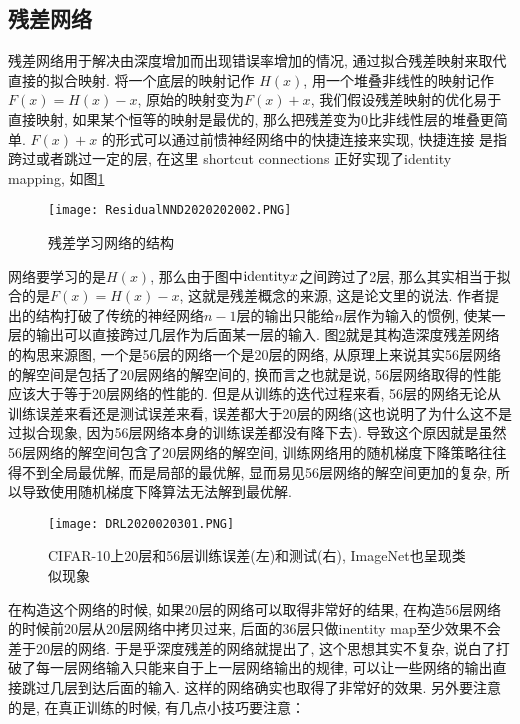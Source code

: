 \subsection{残差网络}
残差网络用于解决由深度增加而出现错误率增加的情况, 通过拟合残差映射来取代直接的拟合映射.
将一个底层的映射记作 $H(x)$, 用一个堆叠非线性的映射记作 $F(x) = H(x) - x$, 原始的映射变为$F(x) + x$, 我们假设残差映射的优化易于直接映射, 如果某个恒等的映射是最优的, 那么把残差变为0比非线性层的堆叠更简单.
$F(x) + x$ 的形式可以通过前愦神经网络中的快捷连接来实现, 快捷连接 是指跨过或者跳过一定的层, 在这里 shortcut connections 正好实现了identity mapping, 如图\ref{ResidualNND2020202002}
\begin{figure}[H]
    \centering
    \texttt{[image: ResidualNND2020202002.PNG]}
    \caption{残差学习网络的结构}
    \label{ResidualNND2020202002}
    \vspace{-0.4cm}
\end{figure}
网络要学习的是$H(x)$, 那么由于图中$\textup{identity} x$之间跨过了2层, 那么其实相当于拟合的是$F(x)=H(x)-x$, 这就是残差概念的来源, 这是论文里的说法.
作者提出的结构打破了传统的神经网络$n-1$层的输出只能给$n$层作为输入的惯例, 使某一层的输出可以直接跨过几层作为后面某一层的输入.
图\ref{DRL2020020301}就是其构造深度残差网络的构思来源图, 一个是56层的网络一个是20层的网络, 从原理上来说其实56层网络的解空间是包括了20层网络的解空间的, 换而言之也就是说, 56层网络取得的性能应该大于等于20层网络的性能的.
但是从训练的迭代过程来看, 56层的网络无论从训练误差来看还是测试误差来看, 误差都大于20层的网络(这也说明了为什么这不是过拟合现象, 因为56层网络本身的训练误差都没有降下去).
导致这个原因就是虽然56层网络的解空间包含了20层网络的解空间, 训练网络用的随机梯度下降策略往往得不到全局最优解, 而是局部的最优解, 显而易见56层网络的解空间更加的复杂, 所以导致使用随机梯度下降算法无法解到最优解.
\begin{figure}[H]
    \centering
    \texttt{[image: DRL2020020301.PNG]}
    \caption{CIFAR-10上20层和56层训练误差(左)和测试(右), ImageNet也呈现类似现象}
    \label{DRL2020020301}
    \vspace{-0.4cm}
\end{figure}

在构造这个网络的时候, 如果20层的网络可以取得非常好的结果, 在构造56层网络的时候前20层从20层网络中拷贝过来, 后面的36层只做inentity map至少效果不会差于20层的网络.
于是乎深度残差的网络就提出了, 这个思想其实不复杂, 说白了打破了每一层网络输入只能来自于上一层网络输出的规律, 可以让一些网络的输出直接跳过几层到达后面的输入.
这样的网络确实也取得了非常好的效果. 另外要注意的是, 在真正训练的时候, 有几点小技巧要注意：

